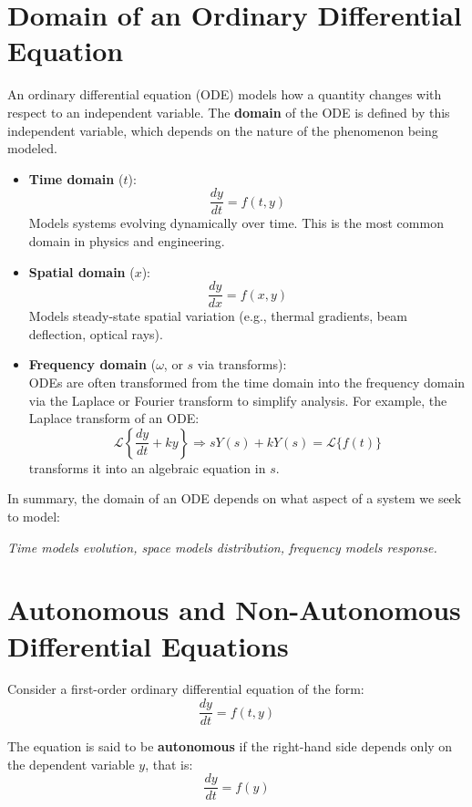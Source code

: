\documentclass[12pt]{article}
\begin{document}
	\section{Domain of an Ordinary Differential Equation}
	
	An ordinary differential equation (ODE) models how a quantity changes with respect to an independent variable. The \textbf{domain} of the ODE is defined by this independent variable, which depends on the nature of the phenomenon being modeled.
	
	\begin{itemize}
		\item \textbf{Time domain} ($t$): 
		$$
		\frac{dy}{dt} = f(t, y)
		$$
		Models systems evolving dynamically over time. This is the most common domain in physics and engineering.
		
		\item \textbf{Spatial domain} ($x$): 
		$$
		\frac{dy}{dx} = f(x, y)
		$$
		Models steady-state spatial variation (e.g., thermal gradients, beam deflection, optical rays).
		
		\item \textbf{Frequency domain} ($\omega$, or $s$ via transforms):
		\\
		ODEs are often transformed from the time domain into the frequency domain via the Laplace or Fourier transform to simplify analysis. For example, the Laplace transform of an ODE:
		$$
		\mathcal{L} \left\{ \frac{dy}{dt} + ky \right\} \Rightarrow sY(s) + kY(s) = \mathcal{L}\{f(t)\}
		$$
		transforms it into an algebraic equation in $s$.
		
	\end{itemize}
	
	\noindent
	In summary, the domain of an ODE depends on what aspect of a system we seek to model:
	\begin{center}
		\textit{Time models evolution, space models distribution, frequency models response.}
	\end{center}
	
	\section{Autonomous and Non-Autonomous Differential Equations}
	
	Consider a first-order ordinary differential equation of the form:  
	$$
	\frac{dy}{dt} = f(t, y)
	$$
	
	The equation is said to be \textbf{autonomous} if the right-hand side depends only on the dependent variable $y$, that is:  
	$$
	\frac{dy}{dt} = f(y)
	$$
	
\end{document}

